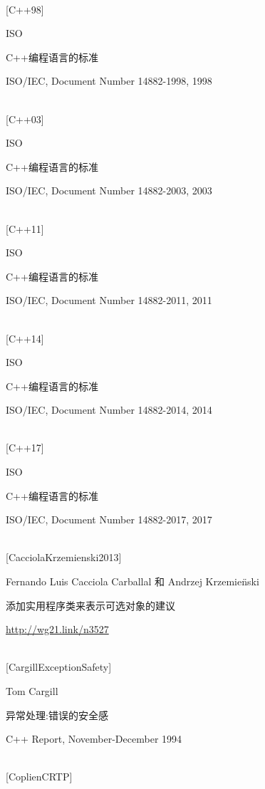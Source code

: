 \hspace*{\fill} \\ %
{[C++98]}

ISO

C++编程语言的标准

ISO/IEC, Document Number 14882-1998, 1998

\hspace*{\fill} \\ %
{[C++03]}

ISO

C++编程语言的标准

ISO/IEC, Document Number 14882-2003, 2003

\hspace*{\fill} \\ %
{[C++11]}

ISO

C++编程语言的标准

ISO/IEC, Document Number 14882-2011, 2011

\hspace*{\fill} \\ %
{[C++14]}

ISO

C++编程语言的标准

ISO/IEC, Document Number 14882-2014, 2014

\hspace*{\fill} \\ %
{[C++17]}

ISO

C++编程语言的标准

ISO/IEC, Document Number 14882-2017, 2017

\hspace*{\fill} \\ %
{[CacciolaKrzemienski2013]}

Fernando Luis Cacciola Carballal 和 Andrzej Krzemie{\"n}ski

添加实用程序类来表示可选对象的建议

\url{http://wg21.link/n3527}

\hspace*{\fill} \\ %
{[CargillExceptionSafety]}

Tom Cargill

异常处理:错误的安全感

C++ Report, November-December 1994

\hspace*{\fill} \\ %
{[CoplienCRTP]}

